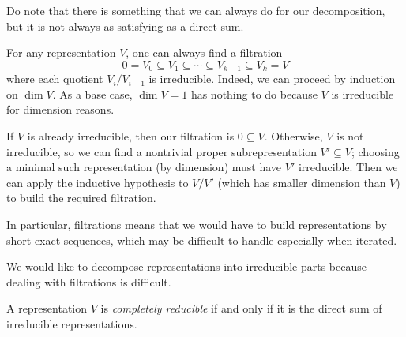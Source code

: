 \documentclass[../notes.tex]{subfiles}
\begin{document}
Do note that there is something that we can always do for our decomposition, but it is not always as satisfying as a direct sum.
\begin{remark}
	For any representation $V$, one can always find a filtration
	\[0=V_0\subseteq V_1\subseteq\cdots\subseteq V_{k-1}\subseteq V_k=V\]
	where each quotient $V_i/V_{i-1}$ is irreducible. Indeed, we can proceed by induction on $\dim V$. As a base case, $\dim V=1$ has nothing to do because $V$ is irreducible for dimension reasons.
	
	If $V$ is already irreducible, then our filtration is $0\subseteq V$. Otherwise, $V$ is not irreducible, so we can find a nontrivial proper subrepresentation $V'\subseteq V$; choosing a minimal such representation (by dimension) must have $V'$ irreducible. Then we can apply the inductive hypothesis to $V/V'$ (which has smaller dimension than $V$) to build the required filtration.
\end{remark}
In particular, filtrations means that we would have to build representations by short exact sequences, which may be difficult to handle especially when iterated.

We would like to decompose representations into irreducible parts because dealing with filtrations is difficult.
\begin{definition}
	A representation $V$ is \textit{completely reducible} if and only if it is the direct sum of irreducible representations.
\end{definition}
\end{document}
